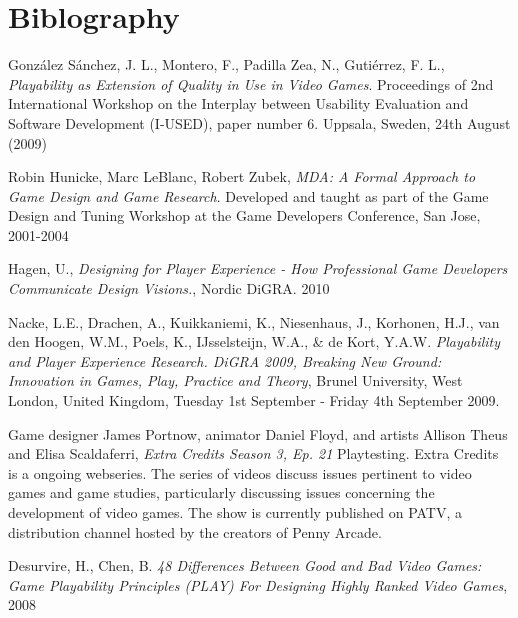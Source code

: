 \section{Biblography}



\begin{thebibliography}{9}

  González Sánchez, J. L., Montero, F., Padilla Zea, N., Gutiérrez, F. L.,
  \emph{Playability as Extension of Quality in Use in Video Games}.
  Proceedings of 2nd International Workshop on the Interplay between
  Usability Evaluation and Software Development (I-USED), paper number 6.
  Uppsala, Sweden,
  24th August (2009)


  Robin Hunicke, Marc LeBlanc, Robert Zubek,
  \emph{MDA: A Formal Approach to Game Design and Game Research}.
  Developed and taught as part of the Game Design and Tuning
  Workshop at the Game Developers Conference,
  San Jose,
  2001-2004

  Hagen, U.,
  \emph{Designing for Player Experience - How Professional Game Developers
    Communicate Design Visions.},
  Nordic DiGRA.
  2010

  Nacke, L.E., Drachen, A., Kuikkaniemi, K., Niesenhaus, J.,
  Korhonen, H.J., van den Hoogen, W.M., Poels, K., IJsselsteijn, W.A., \&
  de Kort, Y.A.W.
  \emph{Playability and Player Experience Research. DiGRA 2009, Breaking New Ground:
    Innovation in Games, Play, Practice and Theory},
  Brunel University, West London, United Kingdom,
  Tuesday 1st September - Friday 4th September 2009.

  Game designer James Portnow, animator Daniel Floyd, and artists
  Allison Theus and Elisa Scaldaferri,
  \emph{Extra Credits Season 3, Ep. 21}
  Playtesting. Extra Credits is a ongoing webseries. The series of
  videos discuss issues pertinent to video games and game studies,
  particularly discussing issues concerning the development of video
  games. The show is currently published on PATV, a distribution channel
  hosted by the creators of Penny Arcade.

  Desurvire, H., Chen, B.
  \emph{48 Differences Between Good and Bad Video Games: Game Playability Principles
    (PLAY) For Designing Highly Ranked Video Games},
  2008

\end{thebibliography}
